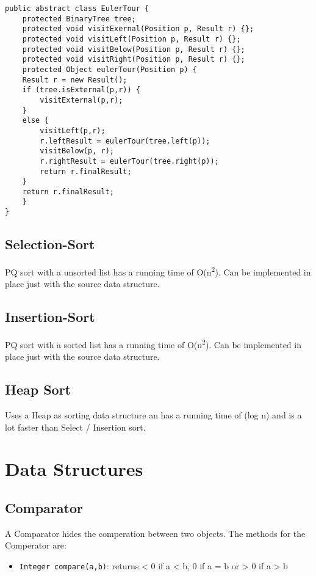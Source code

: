 \documentclass[11pt,twoside,landscape]{article}
\begin{document}
\begin{multicols}{2}
\begin{verbatim}
public abstract class EulerTour {
    protected BinaryTree tree;
    protected void visitExernal(Position p, Result r) {};
    protected void visitLeft(Position p, Result r) {};
    protected void visitBelow(Position p, Result r) {};
    protected void visitRight(Position p, Result r) {};
    protected Object eulerTour(Position p) {
	Result r = new Result();
	if (tree.isExternal(p,r)) {
	    visitExternal(p,r);
	}
	else {
	    visitLeft(p,r);
	    r.leftResult = eulerTour(tree.left(p));
	    visitBelow(p, r);
	    r.rightResult = eulerTour(tree.right(p));
	    return r.finalResult;
	}
	return r.finalResult;
    }
}
\end{verbatim}

\subsection*{Selection-Sort}
\label{sec:orgce4fd00}
PQ sort with a unsorted list has a running time of O(n\textsuperscript{2}). Can be implemented in place just with the source data structure.
\subsection*{Insertion-Sort}
\label{sec:org191edff}
PQ sort with a sorted list has a running time of O(n\textsuperscript{2}). Can be implemented in place just with the source data structure.

\subsection*{Heap Sort}
\label{sec:org85306a5}
Uses a Heap as sorting data structure an has a running time of (log n) and is a lot faster than Select / Insertion sort.
\newpage
\section*{Data Structures}
\label{sec:org529e344}
\subsection*{Comparator}
\label{sec:orga8a78fd}
A Comparator hides the comperation between two objects. The methods for the Comperator are:
\begin{itemize}
\item \texttt{Integer compare(a,b)}: returns < 0 if a < b, 0 if a = b or > 0 if a > b
\end{itemize}

\end{multicols}
\end{document}
